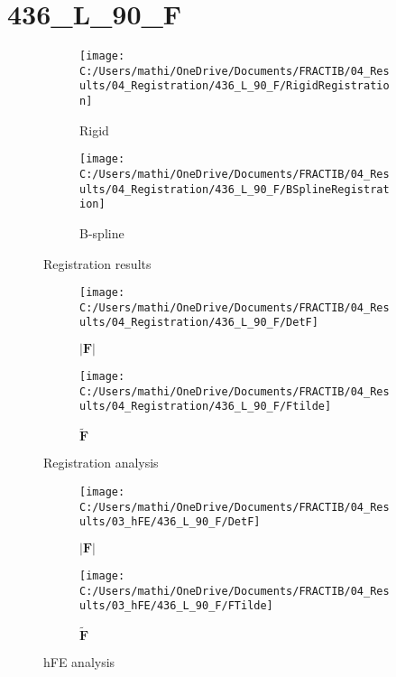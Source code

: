 \documentclass{article}%
\begin{document}
%
\newpage%
\section*{436\_L\_90\_F}%
\label{sec:436L90F}%


\begin{figure}[h!]%
\begin{subfigure}[b]{0.5\linewidth}%
\texttt{[image: C:/Users/mathi/OneDrive/Documents/FRACTIB/04\_Results/04\_Registration/436\_L\_90\_F/RigidRegistration]}%
\caption{Rigid}%
\end{subfigure}%
\begin{subfigure}[b]{0.5\linewidth}%
\texttt{[image: C:/Users/mathi/OneDrive/Documents/FRACTIB/04\_Results/04\_Registration/436\_L\_90\_F/BSplineRegistration]}%
\caption{B{-}spline}%
\end{subfigure}%
\caption{Registration results}%
\end{figure}

%


\begin{figure}[h!]%
\begin{subfigure}[b]{0.5\linewidth}%
\texttt{[image: C:/Users/mathi/OneDrive/Documents/FRACTIB/04\_Results/04\_Registration/436\_L\_90\_F/DetF]}%
\caption{$|\mathbf{F}|$}%
\end{subfigure}%
\begin{subfigure}[b]{0.5\linewidth}%
\texttt{[image: C:/Users/mathi/OneDrive/Documents/FRACTIB/04\_Results/04\_Registration/436\_L\_90\_F/Ftilde]}%
\caption{$\tilde{\mathbf{F}}$}%
\end{subfigure}%
\caption{Registration analysis}%
\end{figure}

%


\begin{figure}[h!]%
\begin{subfigure}[b]{0.5\linewidth}%
\texttt{[image: C:/Users/mathi/OneDrive/Documents/FRACTIB/04\_Results/03\_hFE/436\_L\_90\_F/DetF]}%
\caption{$|\mathbf{F}|$}%
\end{subfigure}%
\begin{subfigure}[b]{0.5\linewidth}%
\texttt{[image: C:/Users/mathi/OneDrive/Documents/FRACTIB/04\_Results/03\_hFE/436\_L\_90\_F/FTilde]}%
\caption{$\tilde{\mathbf{F}}$}%
\end{subfigure}%
\caption{hFE analysis}%
\end{figure}
\end{document}

